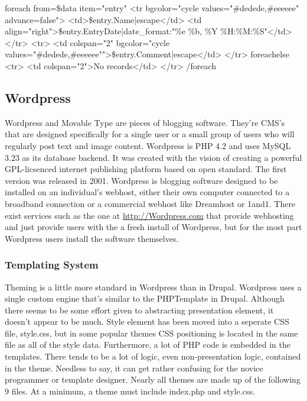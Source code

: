\documentclass[a4paper,12pt]{report}
\begin{document}
    {foreach from=\$data item="entry"}
        <tr bgcolor="{cycle values="#dedede,#eeeeee" advance=false}">
            <td>{\$entry.Name|escape}</td>        
            <td align="right">{\$entry.EntryDate|date_format:"\%e \%b, \%Y \%H:\%M:\%S"}</td>        
        </tr>
        <tr>
            <td colspan="2" bgcolor="{cycle values="#dedede,#eeeeee"}">{\$entry.Comment|escape}</td>
        </tr>
    {foreachelse}
        <tr>
            <td colspan="2">No records</td>
        </tr>
    {/foreach}


\subsection {Wordpress}
Wordpress and Movable Type are pieces of blogging software. 
They're CMS's that are designed specifically for a single user or a small group of users who will regularly post text and image content. 
Wordpress is PHP 4.2 and uses MySQL 3.23 as its database backend. 
It was created with the vision of creating a powerful GPL-licsenced internet publishing platform based on open standard. 
The first version was released in 2001. 
Wordpress is blogging software designed to be installed on an individual's webhost, either their own computer connected to a broadband connection or a commercial webhost like Dreamhost or 1and1. There exist services such as the one at \url{http://Wordpress.com} that provide webhosting and just provide users with the a fresh install of Wordpress, but for the most part Wordpress users install the software themselves. 

\subsubsection{Templating System}
Theming is a little more standard in Wordpress than in Drupal. 
Wordpress uses a single custom engine that's similar to the PHPTemplate in Drupal. 
Although there seems to be some effort given to abstracting presentation element, it doesn't appear to be much. Style element has been moved into a seperate CSS file, style.css, but in some popular themes CSS positioning is located in the same file as all of the style data.
Furthermore, a lot of PHP code is embedded in the templates. 
There tends to be a lot of logic, even non-presentation logic, contained in the theme. Needless to say, it can get rather confusing for the novice programmer or template designer. 
Nearly all themes are made up of the following 9 files. At a minimum, a theme must include index.php and style.css. 
\end{document}
